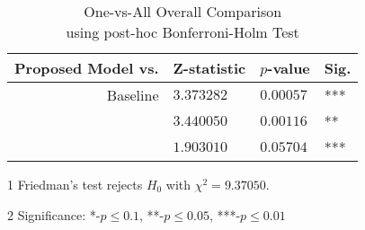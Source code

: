 \begin{table}[!h]
%
\centering
\begin{threeparttable}
\caption{One-vs-All Overall Comparison\\using post-hoc Bonferroni-Holm Test}
\label{results:sdae_stats}
%
\begin{tabular}{@{}r*{3}{l}@{}}
\toprule
Proposed Model vs.                       & Z-statistic    & $p$-value         & Sig.\tnote{2} \\ \midrule
Baseline                                 & $3.373282$      & $0.00057$         & ***          \\
\cite{wang2013protein}                   & $3.440050$      & $0.00116$         & **           \\
\cite{chicco2014deep}                    & $1.903010$      & $0.05704$         & ***          \\ \bottomrule
\end{tabular}
\begin{tablenotes}
\footnotesize
\item[1] Friedman's test rejects $H_{0}$ with $\chi^{2}=\num{9.37050}$.
\item[2] Significance: *-$p\leq0.1$, **-$p\leq0.05$, ***-$p\leq0.01$
\end{tablenotes}
\end{threeparttable}
\end{table}

